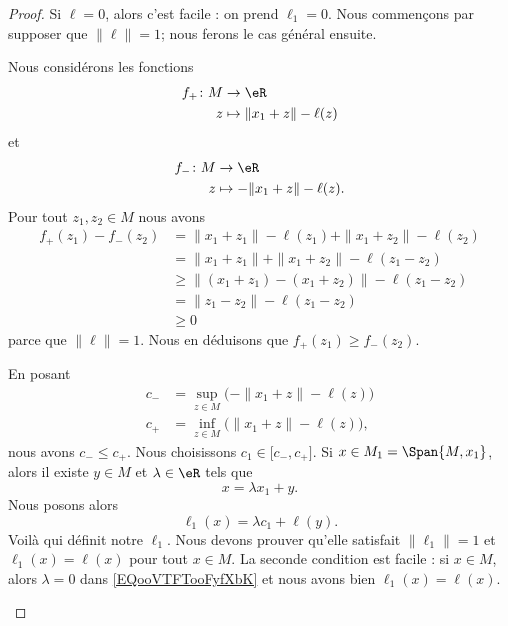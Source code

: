 \begin{proof}
	Si \( \ell=0\), alors c'est facile : on prend \( \ell_1=0\). Nous commençons par supposer que \( \| \ell \|=1\); nous ferons le cas général ensuite.
	\begin{subproof}
		Nous considérons les fonctions
		\begin{equation}
			\begin{aligned}
				f_+\colon M & \to \eR                     \\
				z           & \mapsto \| x_1+z \|-\ell(z)
			\end{aligned}
		\end{equation}
		et
		\begin{equation}
			\begin{aligned}
				f_-\colon M & \to \eR                       \\
				z           & \mapsto -\| x_1+z \|-\ell(z).
			\end{aligned}
		\end{equation}
		Pour tout \( z_1,z_2\in M\) nous avons
		\begin{subequations}
			\begin{align}
				f_+(z_1)-f_-(z_2) & =\| x_1+z_1 \|-\ell(z_1)+\| x_1+z_2 \|-\ell(z_2) \\
				                  & =\| x_1+z_1 \|+\| x_1+z_2 \|-\ell(z_1-z_2)       \\
				                  & \geq \| (x_1+z_1)-(x_1+z_2) \|-\ell(z_1-z_2)     \\
				                  & =\| z_1-z_2  \|-\ell(z_1-z_2)                    \\
				                  & \geq 0
			\end{align}
		\end{subequations}
		parce que \( \| \ell \|=1\). Nous en déduisons que \( f_+(z_1)\geq f_-(z_2)\).


		En posant
		\begin{subequations}
			\begin{align}
				c_- & =\sup_{z\in M}\big( -\| x_1+z \|-\ell(z) \big)  \\
				c_+ & =\inf_{z\in M}\big(  \| x_1+z \|-\ell(z) \big),
			\end{align}
		\end{subequations}
		nous avons \( c_-\leq c_+\). Nous choisissons \( c_1\in \mathopen[ c_- , c_+ \mathclose]\).
		\spitem[La définition]
		Si \( x\in M_1=\Span{M,x_1}\), alors il existe \( y\in M\) et \( \lambda\in \eR\) tels que
		\begin{equation}
			x=\lambda x_1+y.
		\end{equation}
		Nous posons alors
		\begin{equation}        \label{EQooVTFTooFyfXbK}
			\ell_1(x)=\lambda c_1+\ell(y).
		\end{equation}
		Voilà qui définit notre \( \ell_1\). Nous devons prouver qu'elle satisfait \( \| \ell_1 \|=1\) et \( \ell_1(x)=\ell(x)\) pour tout \( x\in M\). La seconde condition est facile : si \( x\in M\), alors \( \lambda=0\) dans \eqref{EQooVTFTooFyfXbK} et nous avons bien \( \ell_1(x)=\ell(x)\).


\end{subproof}
\end{proof}
